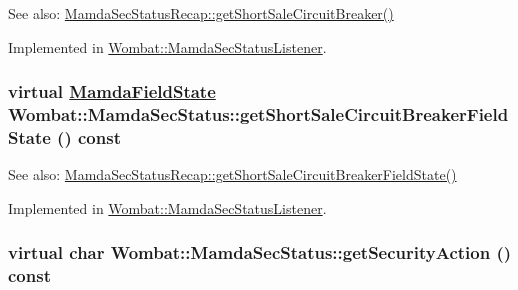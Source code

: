 \begin{Desc}
\item[See also:]\hyperlink{classWombat_1_1MamdaSecStatusRecap_80cb008d40d5435b74a3852926d3caa5}{Mamda\-Sec\-Status\-Recap::get\-Short\-Sale\-Circuit\-Breaker()} \end{Desc}


Implemented in \hyperlink{classWombat_1_1MamdaSecStatusListener_4cb86f6d7afb14e8d6411221d8941805}{Wombat::Mamda\-Sec\-Status\-Listener}.\hypertarget{classWombat_1_1MamdaSecStatus_6bd9783d55cd92b9c4d7c7a2db736e27}{
\subsubsection[getShortSaleCircuitBreakerFieldState]{\setlength{\rightskip}{0pt plus 5cm}virtual \hyperlink{namespaceWombat_93aac974f2ab713554fd12a1fa3b7d2a}{Mamda\-Field\-State} Wombat::Mamda\-Sec\-Status::get\-Short\-Sale\-Circuit\-Breaker\-Field\-State () const}}
\label{classWombat_1_1MamdaSecStatus_6bd9783d55cd92b9c4d7c7a2db736e27}


\begin{Desc}
\item[See also:]\hyperlink{classWombat_1_1MamdaSecStatusRecap_ab1dabb0f90d5d2bccb7e6a5c2a80f98}{Mamda\-Sec\-Status\-Recap::get\-Short\-Sale\-Circuit\-Breaker\-Field\-State()} \end{Desc}


Implemented in \hyperlink{classWombat_1_1MamdaSecStatusListener_a6bf492643a4963d80cdc05134955358}{Wombat::Mamda\-Sec\-Status\-Listener}.\hypertarget{classWombat_1_1MamdaSecStatus_b143773aacba9fabb91693884ae8d87a}{
\subsubsection[getSecurityAction]{\setlength{\rightskip}{0pt plus 5cm}virtual char Wombat::Mamda\-Sec\-Status::get\-Security\-Action () const}}
\label{classWombat_1_1MamdaSecStatus_b143773aacba9fabb91693884ae8d87a}


